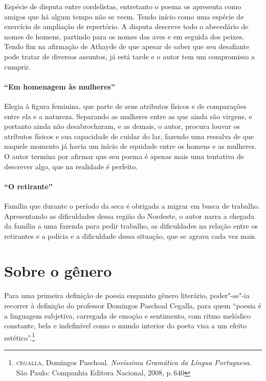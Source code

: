 Espécie de disputa entre cordelistas, entretanto o poema os apresenta
como amigos que há algum tempo não se veem. Tendo início como uma
espécie de exercício de ampliação de repertório. A disputa descreve
todo o abecedário de nomes de homens, partindo para os nomes das aves e
em seguida dos peixes. Tendo fim na afirmação de Athayde de que apesar
de saber que seu desafiante pode tratar de diversos assuntos, já está
tarde e o autor tem um compromisso a cumprir.

\paragraph{``Em homenagem às mulheres''}

Elegia à figura feminina, que parte de seus atributos físicos e de
comparações entre ela e a natureza. Separando as mulheres entre as que
ainda são virgens, e portanto ainda não desabrocharam, e as demais, o
autor, procura louvar os atributos físicos e sua capacidade de cuidar
do lar, fazendo uma ressalva de que naquele momento já havia um início
de equidade entre os homens e as mulheres. O autor termina por afirmar
que seu poema é apenas mais uma tentativa de descrever algo, que na
realidade é perfeito. 

\paragraph{``O retirante''}

Família que durante o período da seca é obrigada a migrar em busca de
trabalho. Apresentando as dificuldades dessa região do Nordeste, o
autor narra a chegada da família a uma fazenda para pedir trabalho, as
dificuldades na relação entre os retirantes e a polícia e a
dificuldade dessa situação, que se agrava cada vez mais. 

\section{Sobre o gênero}

Para uma primeira definição de poesia enquanto gênero literário, poder"-se"-ia recorrer à definição do professor Domingos Paschoal Cegalla, para quem ``poesia é a linguagem subjetiva, carregada de emoção e sentimento, com ritmo melódico constante, bela e indefinível como o mundo interior do poeta visa a um efeito estético''.\footnote{\textsc{cegalla}, Domingos Paschoal. \textit{Novíssima Gramática da Língua Portuguesa}. São Paulo: Companhia Editora Nacional, 2008, p.\,640}

